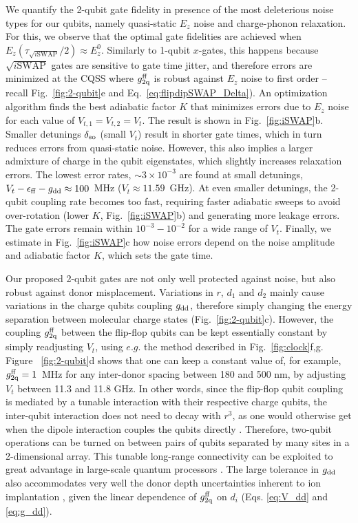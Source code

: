 \documentclass[aps,prb,superscriptaddress,nobibnotes,twocolumn]{revtex4-1}
\begin{document}
We quantify the 2-qubit gate fidelity in presence of the most deleterious noise types for our qubits, namely quasi-static $E_z$ noise and charge-phonon relaxation. For this, we observe that the optimal gate fidelities are achieved when $E_z(\tau_{\sqrt{i\mathrm{SWAP}}}/2)\approx E_z^0$. Similarly to 1-qubit $x$-gates, this happens because $\sqrt{i\mathrm{SWAP}}$ gates are sensitive to gate time jitter, and therefore errors are minimized at the CQSS where $g_{\rm 2q}^{\rm ff}$ is robust against $E_z$ noise to first order -- recall Fig.~\ref{fig:2-qubit}e and Eq.~\ref{eq:flipdipSWAP_Delta}). An optimization algorithm finds the best adiabatic factor $K$ that minimizes errors due to $E_z$ noise for each value of $V_{t,1}=V_{t,2}=V_t$. The result is shown in Fig.~\ref{fig:iSWAP}b. Smaller detunings $\delta_{\rm so}$ (small $V_t$) result in shorter gate times, which in turn reduces errors from quasi-static noise. However, this also implies a larger admixture of charge in the qubit eigenstates, which slightly increases relaxation errors. The lowest error rates, $\sim3\times10^{-3}$ are found at small detunings, $V_t-\epsilon_{\rm ff}-g_{\rm dd}\approx 100$~MHz ($V_t\approx11.59$~GHz). At even smaller detunings, the 2-qubit coupling rate becomes too fast, requiring faster adiabatic sweeps to avoid over-rotation (lower $K$, Fig.~\ref{fig:iSWAP}b) and generating more leakage errors. The gate errors remain within $10^{-3}-10^{-2}$ for a wide range of $V_t$. Finally, we estimate in Fig.~\ref{fig:iSWAP}c how noise errors depend on the noise amplitude and adiabatic factor $K$, which sets the gate time.

Our proposed 2-qubit gates are not only well protected against noise, but also robust against donor misplacement. Variations in $r$, $d_1$ and $d_2$ mainly cause variations in the charge qubits coupling $g_{\rm dd}$, therefore simply changing the energy separation between molecular charge states (Fig.~\ref{fig:2-qubit}c). However, the coupling $g_{\rm 2q}^{\rm ff}$ between the flip-flop qubits can be kept essentially constant by simply readjusting $V_t$, using $e.g.$ the method described in Fig.~\ref{fig:clock}f,g. Figure ~\ref{fig:2-qubit}d shows that one can keep a constant value of, for example, $g_{\rm 2q}^{\rm ff} = 1$~MHz for any inter-donor spacing between 180 and 500 nm, by adjusting $V_t$ between 11.3 and 11.8 GHz. In other words, since the flip-flop qubit coupling is mediated by a tunable interaction with their respective charge qubits, the inter-qubit interaction does not need to decay with $r^3$, as one would otherwise get when the dipole interaction couples the qubits directly \cite{Ogorman2014,Hill2015}. Therefore, two-qubit operations can be turned on between pairs of qubits separated by many sites in a 2-dimensional array. This tunable long-range connectivity can be exploited to great advantage in large-scale quantum processors \cite{Li2017}. The large tolerance in $g_{\rm dd}$ also accommodates very well the donor depth uncertainties inherent to ion implantation \cite{Donkelaar2015}, given the linear dependence of $g_{\rm 2q}^{\rm ff}$ on $d_i$ (Eqs. \ref{eq:V_dd} and \ref{eq:g_dd}).  
\end{document}
